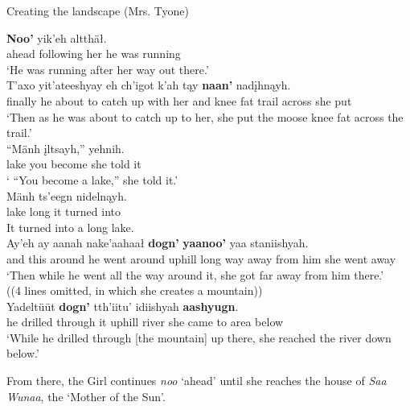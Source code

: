 \begin{exe}
\ex Creating the landscape (Mrs. Tyone) \label{brucks:fleeing-tyone}
\begin{xlist}

\ex \gll \textbf{Noo’} yik’eh altthäł.  \\
 ahead {following her} {he was running} \\
\glt `He was running after her way out there.' \\

\ex \gll T’axo yit'ateeshyay eh ch’igot k’ah tąy \textbf{naan’} nadįhnąyh.  \\
 finally {he about to catch up with her} and knee fat trail across {she put} \\
\glt `Then as he was about to catch up to her, she put the moose knee fat across the trail.' \\

\ex \gll ``Mänh įltsayh,'' yehnih.  \\
 lake {you become} {she told it} \\
\glt ` “You become a lake,” she told it.' \\

\ex \gll Mänh ts’eegn nidelnąyh.  \\
 lake long {it turned into} \\
\glt It turned into a long lake. \\

\ex \gll Ay’eh ay aanah nake'aahaał \textbf{dogn’} \textbf{yaanoo’} yaa staniishyah.  \\
 and this around {he went around} uphill {long way away} {from him} {she went away} \\
\glt `Then while he went all the way around it, she got far away from him there.' \\

\sn ((4 lines omitted, in which she creates a mountain))\\

\ex \gll Yadeltüüt \textbf{dogn’} tth’iitu’ idiishyah \textbf{aashyugn}.  \\
 {he drilled through it} {uphill} river {she came to} {area below} \\
\glt `While he drilled through [the mountain] up there, she reached the river down below.' \\
\end{xlist}
\end{exe}

From there, the Girl continues \textit{noo} `ahead' until she reaches the house of \textit{Saa Wunaa}, the `Mother of the Sun'.

